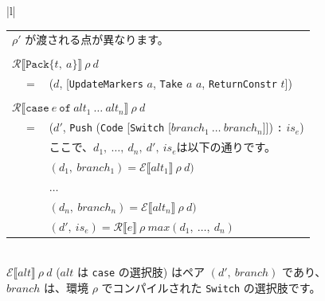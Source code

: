 \documentclass{jbook}
\begin{document}
\begin{tabular} {|l|}
\begin{tabular}{r c l}
		\multicolumn{3}{l}{$\rho'$ が渡される点が異なります。}                                                                                                                             \\
		\\
		\multicolumn{3}{l}{$\mathcal{R} \llbracket \texttt{Pack\{} t, ~ a \texttt{\}} \rrbracket ~ \rho ~ d$}                                                                              \\
		 & $=$ & ($d$, [\texttt{UpdateMarkers} $a$, \texttt{Take} $a$ $a$, \texttt{ReturnConstr} $t$])                                                                                     \\
		\\
		\multicolumn{3}{l}{$\mathcal{R} \llbracket \texttt{case} ~ e ~ \texttt{of} ~ alt_1 ~ \ldots ~ alt_n \rrbracket ~ \rho ~ d$}                                                        \\
		 & $=$ & ($d'$, \texttt{Push} (\texttt{Code} [\texttt{Switch} [$branch_1 ~ \ldots ~ branch_n$]]) \texttt{:} $is_e$)                                                                \\
		 &     & ここで、$d_1, ~ \ldots, ~ d_n, ~ d', ~ is_e$は以下の通りです。                                                                                                            \\
		 &     & $(d_1, ~ branch_1) = \mathcal{E} \llbracket alt_1 \rrbracket ~ \rho ~ d)$                                                                                                 \\
		 &     & $\dots$                                                                                                                                                                   \\
		 &     & $(d_n, ~ branch_n) = \mathcal{E} \llbracket alt_n \rrbracket ~ \rho ~ d)$                                                                                                 \\
		 &     & $(d', ~ is_e) = \mathcal{R} \llbracket e \rrbracket ~ \rho ~ max(d_1, ~ \ldots, ~ d_n)$                                                                                   \\
	\end{tabular}
	\\ \hline
	$\mathcal{E} \llbracket alt \rrbracket ~ \rho ~ d$ ($alt$ は \texttt{case} の選択肢) はペア $(d', ~ branch)$ であり、 \\
	$branch$ は、環境 $\rho$ でコンパイルされた \texttt{Switch} の選択肢です。                                            \\

\end{tabular}
\end{document}
